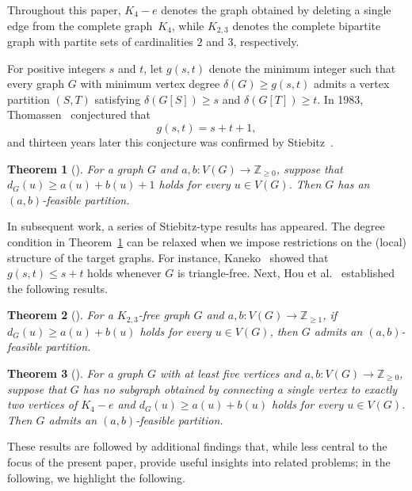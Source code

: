 \documentclass[11p]{elsarticle}
\newtheorem{thm}{Theorem}
\theoremstyle{definition}
\begin{document}
	Throughout this paper, $K_4-e$ denotes the graph obtained by deleting a single edge from the complete graph~$K_4$, while $K_{2,3}$ denotes the complete bipartite graph with partite sets of cardinalities $2$ and $3$, respectively.
	 

For positive integers $s$ and $t$, let $g(s,t)$ denote the minimum integer such that 
every graph $G$ with minimum vertex degree $\delta(G) \ge g(s,t)$ admits a vertex partition 
$(S,T)$ satisfying $\delta(G[S]) \ge s$ and $\delta(G[T]) \ge t$. 
In 1983, Thomassen~\cite{Thomassen} conjectured that 
\[
g(s,t) = s + t + 1,
\]
and thirteen years later this conjecture was confirmed by Stiebitz~\cite{Sti}.

	 
	 \begin{thm}[\cite{Sti}]\label{thm:A} For a graph $ G $ and $ a,b\colon V(G)\longrightarrow \mathbb{Z}_{\ge 0}$, 
	 	suppose that $ d_G(u) \ge a(u) + b(u) + 1 $ holds for every $ u  \in V (G) $. Then $ G $ has an $ (a,b) $-feasible partition.\end{thm}
	  	 
	 In subsequent work, a series of Stiebitz-type results has appeared. The degree condition in Theorem~\ref{thm:A} can be relaxed when we impose restrictions on the (local) structure of the target graphs. 
	 For instance, Kaneko~\cite{Kaneko} showed that 
	 $
	 g(s,t) \le s + t
	 $
	 holds whenever $G$ is triangle-free. Next, Hou et al.~\cite{Hou} established the following results.
	 
	 
	 \begin{thm}[\cite{Hou}]\label{thm:B} For a $ K_{2,3} $-free graph $G$ and $ a,b\colon V(G)\longrightarrow \mathbb{Z}_{\geq 1}$, if $ d_G(u) \ge  a(u) + b(u) $ holds for every
	 	$ u \in  V(G)$, then $ G $ admits an $ (a, b) $-feasible partition.
	 \end{thm}
	
	\begin{thm}[\cite{Hou}]\label{thm:C} For a graph $ G $  with at least five vertices and  $ a,b\colon V(G)\longrightarrow \mathbb{Z}_{\geq 0}$, suppose that $ G $ has no subgraph
		obtained by connecting a single vertex to exactly two vertices of $ K_{4} -e $  and  $ d_G(u) \ge  a(u) + b(u) $ holds for every
		$ u \in  V(G)$. Then $ G $ admits an $ (a, b) $-feasible partition.
		\end{thm}
	 
These results are followed by additional findings that, while less central to the focus of the present paper, provide useful insights into related problems; in the following, we highlight the following.
\end{document}
